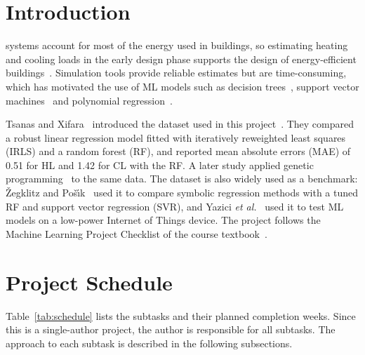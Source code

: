 \documentclass[journal]{IEEEtran}
\begin{document}
\section{Introduction}
 systems account for most of the energy used in buildings, so estimating heating
and cooling loads in the early design phase supports the design of energy-efficient buildings~\cite{tsanas2012}.
Simulation tools provide reliable estimates but are time-consuming, which has motivated the use of ML
models such as decision trees~\cite{yu2010}, support vector machines~\cite{dong2005} and polynomial
regression~\cite{catalina2008}.

Tsanas and Xifara~\cite{tsanas2012} introduced the dataset used in this project~\cite{uci2012}. They
compared a robust linear regression model fitted with iteratively reweighted least squares (IRLS) and a
random forest (RF), and reported mean absolute errors (MAE) of 0.51 for HL and 1.42 for CL with the RF. A later study
applied genetic programming~\cite{castelli2015} to the same data. The dataset is also widely used as a benchmark: \v{Z}egklitz and Po\v{s}\'{\i}k~\cite{zegklitz2017}
used it to compare symbolic regression methods with a tuned RF and support vector regression (SVR), and
Yazici \emph{et al.}~\cite{yazici2018} used it to test ML models on a low-power Internet of Things device.
The project follows the Machine Learning Project Checklist of the course textbook~\cite{geron2022}.

\section{Project Schedule}
Table~\ref{tab:schedule} lists the subtasks and their planned completion weeks. Since this is a
single-author project, the author is responsible for all subtasks. The approach to each subtask is
described in the following subsections.
\end{document}
